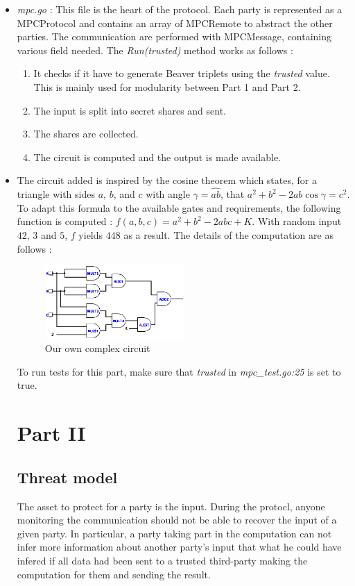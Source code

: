 \documentclass[10pt,conference]{IEEEtran}
\begin{document}
\begin{itemize}
\begin{itemize}
        \end{itemize}
    \item \textit{mpc.go} : This file is the heart of the protocol. Each party is represented as a MPCProtocol and contains an array of MPCRemote to abstract the other parties. The communication are performed with MPCMessage, containing various field needed. The \textit{Run(trusted)} method works as follows :
        \begin{enumerate}
            \item It checks if it have to generate Beaver triplets using the \textit{trusted} value. This is mainly used for modularity between Part 1 and Part 2.
            \item The input is split into secret shares and sent.
            \item The shares are collected.
            \item The circuit is computed and the output is made available.
        \end{enumerate}
    \item The circuit added is inspired by the cosine theorem which states, for a triangle with sides $a$, $b$, and $c$ with angle $\gamma = \widehat{ab}$, that $a^2 + b^2 - 2ab\cos\gamma = c^2$. To adapt this formula to the available gates and requirements, the following function is computed : $f(a,b,c) = a^2 + b^2 - 2abc + K$. With random input $42$, $3$ and $5$, $f$ yields $448$ as a result. The details of the computation are as follows :
      \begin{figure}[h]
        \caption{Our own complex circuit}
        \includegraphics[width=0.5\textwidth]{main.png}
      \end{figure}
To run tests for this part, make sure that \textit{trusted} in \textit{mpc\_test.go:25} is set to true.

\section{Part II}
\subsection{Threat model}
The asset to protect for a party is the input. During the protocl, anyone monitoring the communication should not be able to recover the input of a given party. In particular, a party taking part in the computation can not infer more information about another party's input that what he could have infered if all data had been sent to a trusted third-party making the computation for them and sending the result.


\end{itemize}
\end{document}
